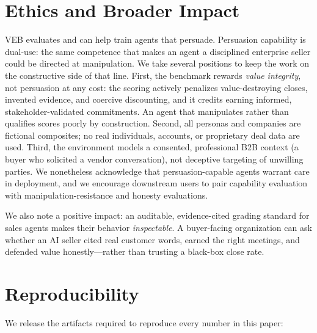 \section{Ethics and Broader Impact}
\label{sec:ethics}

VEB evaluates and can help train agents that persuade. Persuasion capability is
dual-use: the same competence that makes an agent a disciplined enterprise seller
could be directed at manipulation. We take several positions to keep the work on
the constructive side of that line. First, the benchmark rewards \emph{value
integrity}, not persuasion at any cost: the scoring actively penalizes
value-destroying closes, invented evidence, and coercive discounting, and it
credits earning informed, stakeholder-validated commitments. An agent that
manipulates rather than qualifies scores poorly by construction. Second, all
personas and companies are fictional composites; no real individuals, accounts, or
proprietary deal data are used. Third, the environment models a consented,
professional B2B context (a buyer who solicited a vendor conversation), not
deceptive targeting of unwilling parties. We nonetheless acknowledge that
persuasion-capable agents warrant care in deployment, and we encourage downstream
users to pair capability evaluation with manipulation-resistance and honesty
evaluations.

We also note a positive impact: an auditable, evidence-cited grading standard for
sales agents makes their behavior \emph{inspectable}. A buyer-facing organization
can ask whether an AI seller cited real customer words, earned the right meetings,
and defended value honestly---rather than trusting a black-box close rate.

\section{Reproducibility}
\label{sec:repro}

We release the artifacts required to reproduce every number in this paper:

